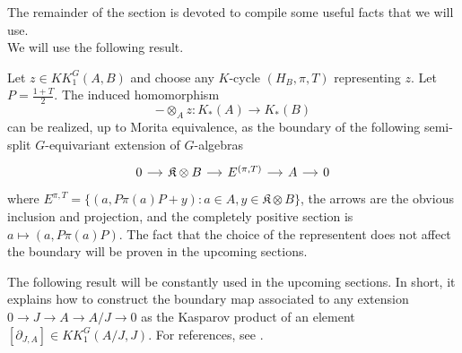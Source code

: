 The remainder of the section is devoted to compile some useful facts that we will use.\\

We will use the following result.\cite{blackadar}\cite{CuSk}


\begin{prop}
Let $z\in KK^G_1(A,B)$ and choose any $K$-cycle $(H_B,\pi,T)$ representing $z$. Let $P=\frac{1+T}{2}$. The induced homomorphism 
\[-\otimes_A z : K_*(A)\rightarrow K_*(B)\]
can be realized, up to Morita equivalence, as the boundary of the following semi-split $G$-equivariant extension of $G$-algebras
\[\begin{tikzcd}[column sep = small] 
0 \arrow{r}& \mathfrak K \otimes B \arrow{r} & E^{(\pi,T)} \arrow{r} & A \arrow{r} & 0\end{tikzcd}\]
where $E^{\pi,T}=\{(a,P\pi(a)P +y) : a\in A , y\in \mathfrak K \otimes B\}$, the arrows are the obvious inclusion and projection, and the completely positive section is $a\mapsto (a, P \pi(a) P)$. The fact that the choice of the representent does not affect the boundary will be proven in the upcoming sections. 
\end{prop}

The following result will be constantly used in the upcoming sections. In short, it explains how to construct the boundary map associated to any extension $0\rightarrow J\rightarrow A \rightarrow A/J \rightarrow 0$ as the Kasparov product of an element $[\partial_{J,A}]\in KK^G_1(A/J,J)$. For references, see \cite{blackadar}.\\

